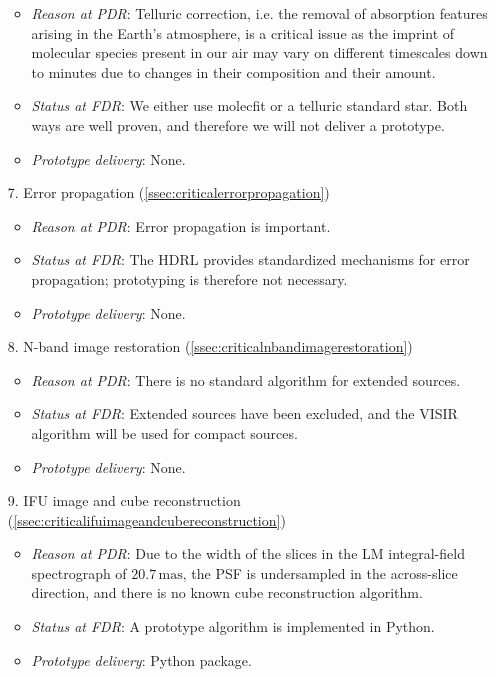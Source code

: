 \begin{enumerate}
\begin{itemize}
        \item \textit{Reason at PDR}: Telluric correction, i.e. the removal of absorption features arising in the Earth’s atmosphere, is a critical issue as the imprint of molecular species present in our air may vary on different timescales down to minutes due to changes in their composition and their amount.
        \item \textit{Status at FDR}: We either use molecfit or a telluric standard star. Both ways are well proven, and therefore we will not deliver a prototype.
        \item \textit{Prototype delivery}: None.
    \end{itemize}
    \item[7.] Error propagation (\ref{ssec:criticalerrorpropagation})
    \begin{itemize}
        \item \textit{Reason at PDR}: Error propagation is important.
        \item \textit{Status at FDR}: The \ac{HDRL} provides standardized mechanisms for error propagation; prototyping is therefore not necessary.
        \item \textit{Prototype delivery}: None.
    \end{itemize}
    \item[8.] N-band image restoration (\ref{ssec:criticalnbandimagerestoration})
    \begin{itemize}
        \item \textit{Reason at PDR}: There is no standard algorithm for extended sources.
        \item \textit{Status at FDR}: Extended sources have been excluded, and the VISIR algorithm will be used for compact sources.
        \item \textit{Prototype delivery}: None.
    \end{itemize}
    \item[9.] IFU image and cube reconstruction (\ref{ssec:criticalifuimageandcubereconstruction})
    \begin{itemize}
        \item \textit{Reason at PDR}: Due to the width of the slices in the LM integral-field spectrograph of $20.7\,\mathrm{mas}$,
            the PSF is undersampled in the across-slice direction, and there is no known cube reconstruction algorithm.
        \item \textit{Status at FDR}: A prototype algorithm is implemented in Python.
        \item \textit{Prototype delivery}: Python package.

\end{itemize}
\end{enumerate}
